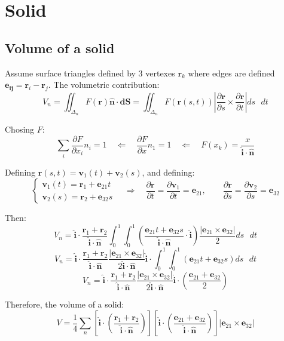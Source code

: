 \section{Solid}
\subsection{Volume of a solid}
Assume surface triangles defined by 3 vertexes $\mathbf r_k$ where edges are defined $\mathbf {e_{ij}} = \mathbf r_i - \mathbf r_j$. The volumetric contribution:
$$
V_n = \iint_{\Delta_n} F(\mathbf r)\mathbf{\hat n}\cdot\mathbf{dS} = 
\iint_{\Delta_n} F(\mathbf r(s, t))\left|\frac{\partial\mathbf r}{\partial s}\times\frac{\partial\mathbf r}{\partial t} \right| ds\mbox{ }dt
$$

Chosing $F$:
$$
\sum_i \frac{\partial F}{\partial x_i}n_i = 1 \quad\Longleftarrow\quad
\frac{\partial F}{\partial x}n_1 = 1 \quad\Longleftarrow\quad
F(x_k) = \frac{x}{\mathbf{\hat i}\cdot\mathbf{\hat n}}
$$


Defining $\mathbf r(s, t) = \mathbf v_1(t) + \mathbf v_2 (s)$, and defining:
\[
  \begin{cases}
   \mathbf v_1(t) = \mathbf r_1 + \mathbf e_{21}t  \\
   \mathbf v_2(s) = \mathbf r_2 + \mathbf e_{32}s
  \end{cases}
  \quad\Longrightarrow\quad
  \frac{\partial\mathbf r}{\partial t} = \frac{\partial\mathbf v_1}{\partial t} = \mathbf e_{21}, \quad\quad
  \frac{\partial\mathbf r}{\partial s} = \frac{\partial\mathbf v_2}{\partial s} = \mathbf e_{32}
\]

Then:
$$
V_n = \mathbf{\hat i}\cdot\frac{\mathbf r_1 + \mathbf r_2}{\mathbf{\hat i}\cdot\mathbf{\hat n}}
\int_0^1\int_0^1 \left(\frac{\mathbf e_{21}t + \mathbf e_{32}s}{\mathbf{\hat i}\cdot\mathbf{\hat n}}\cdot\mathbf{\hat i}\right) \frac{\left|\mathbf e_{21}\times\mathbf e_{32} \right|}{2} ds\mbox{ }dt
$$
$$
V_n = \mathbf{\hat i}\cdot\frac{\mathbf r_1 + \mathbf r_2}{\mathbf{\hat i}\cdot\mathbf{\hat n}} 
\frac{\left|\mathbf e_{21}\times\mathbf e_{32} \right|}{2 \mathbf{\hat i}\cdot\mathbf{\hat n}}\mathbf{\hat i}\cdot
\int_0^1\int_0^1 \left(\mathbf e_{21}t + \mathbf e_{32}s\right) ds\mbox{ }dt
$$
$$
V_n = \mathbf{\hat i}\cdot\frac{\mathbf r_1 + \mathbf r_2}{\mathbf{\hat i}\cdot\mathbf{\hat n}} 
\frac{\left|\mathbf e_{21}\times\mathbf e_{32} \right|}{2 \mathbf{\hat i}\cdot\mathbf{\hat n}}\mathbf{\hat i}\cdot
\left(\frac{\mathbf e_{21} + \mathbf e_{32}}{2}\right)
$$

Therefore, the volume of a solid:
$$
V =  \frac{1}{4} \sum_n
\left[ \mathbf{\hat i}\cdot \left( \frac{\mathbf r_1 + \mathbf r_2}{\mathbf{\hat i}\cdot\mathbf{\hat n}}\right) \right]
\left[ \mathbf{\hat i}\cdot \left( \frac{\mathbf e_{21} + \mathbf e_{32}}{\mathbf{\hat i}\cdot\mathbf{\hat n}}\right) \right]
\left|\mathbf e_{21}\times\mathbf e_{32} \right|
$$
\newpage


